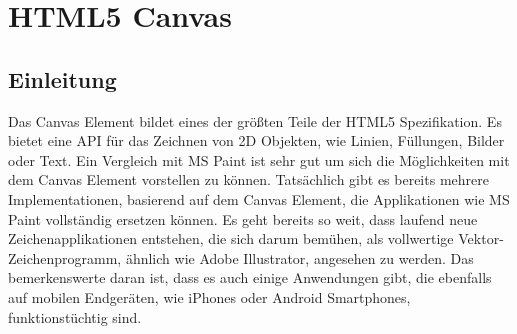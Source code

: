 \chapter{HTML5 Canvas}


\section{Einleitung}
Das Canvas Element bildet eines der größten Teile der HTML5 Spezifikation.
Es bietet eine API für das Zeichnen von 2D Objekten, wie Linien, Füllungen,
Bilder oder Text. Ein Vergleich mit MS Paint ist sehr gut um sich die
Möglichkeiten mit dem Canvas Element vorstellen zu können. Tatsächlich
gibt es bereits mehrere Implementationen, basierend auf dem Canvas Element,
die Applikationen wie MS Paint vollständig ersetzen können. Es geht bereits so
weit, dass laufend neue Zeichenapplikationen entstehen, die sich darum
bemühen, als vollwertige Vektor-Zeichenprogramm, ähnlich wie Adobe
Illustrator, angesehen zu werden. Das bemerkenswerte daran ist, dass es
auch einige Anwendungen gibt, die ebenfalls auf mobilen Endgeräten, wie
iPhones oder Android Smartphones, funktionstüchtig sind.


